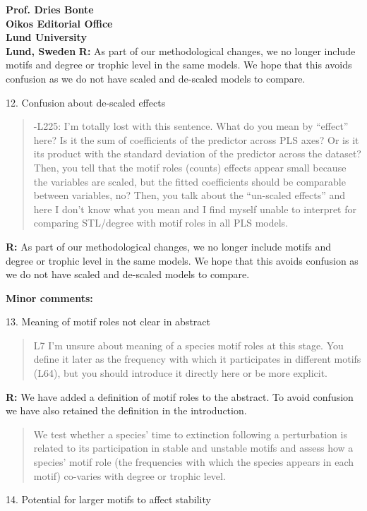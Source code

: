 \documentclass[12pt]{letter}
\begin{document}
\begin{letter}{\bf Prof. Dries Bonte\\
Oikos Editorial Office \\
Lund University \\
Lund, Sweden}
        \textbf{R:} As part of our methodological changes, we no longer include motifs and degree or trophic level in the same models. We hope that this avoids confusion as we do not have scaled and de-scaled models to compare.


    12. Confusion about de-scaled effects
    
        \begin{quotation}
        -L225: I’m totally lost with this sentence. What do you mean by ``effect'' here? Is it the sum of coefficients of the predictor across PLS axes? Or is it its product with the standard deviation of the predictor across the dataset? Then, you tell that the motif roles (counts) effects appear small because the variables are scaled, but the fitted coefficients should be comparable between variables, no?  Then, you talk about the ``un-scaled effects'' and here I don’t know what you mean and I find myself unable to interpret for comparing STL/degree with motif roles in all PLS models.
        \end{quotation}
        
        \textbf{R:} As part of our methodological changes, we no longer include motifs and degree or trophic level in the same models. We hope that this avoids confusion as we do not have scaled and de-scaled models to compare.


  \textbf{Minor comments:}

    13. Meaning of motif roles not clear in abstract

    \begin{quotation}
      L7  I’m unsure about meaning of a species motif roles at this stage. You define it later as the frequency with which it participates in different motifs (L64), but you should introduce it directly here or be more explicit.
      \end{quotation}

      \textbf{R:} We have added a definition of motif roles to the abstract. To avoid confusion we have also retained the definition in the introduction.

      \begin{quotation}
       We test whether a species' time to extinction following a perturbation is related to its participation in stable and unstable motifs and assess how a species' motif role (the frequencies with which the species appears in each motif) co-varies with degree or trophic level.
      \end{quotation}


    14. Potential for larger motifs to affect stability


\end{letter}
\end{document}
